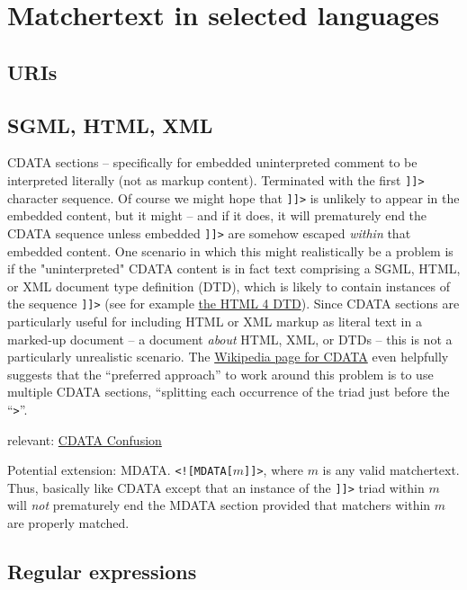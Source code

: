 \section{Matchertext in selected languages}
\label{sec:langs}


\subsection{URIs}

\subsection{SGML, HTML, XML}

CDATA sections -- specifically for embedded uninterpreted comment
to be interpreted literally (not as markup content).
Terminated with the first \verb|]]>| character sequence.
Of course we might hope that \verb|]]>| is unlikely to appear
in the embedded content, but it might --
and if it does, it will prematurely end the CDATA sequence
unless embedded \verb|]]>| are somehow escaped
\emph{within} that embedded content.
One scenario in which this might realistically be a problem
is if the "uninterpreted" CDATA content is in fact
text comprising a SGML, HTML, or XML document type definition (DTD),
which is likely to contain instances of the sequence \verb|]]>|
(see for example
\href{https://www.w3.org/TR/html4/sgml/dtd.html}{the HTML 4 DTD}).
Since CDATA sections are particularly useful
for including HTML or XML markup as literal text in a marked-up document --
\eg a document \emph{about} HTML, XML, or DTDs --
this is not a particularly unrealistic scenario.
The \href{https://en.wikipedia.org/wiki/CDATA}{Wikipedia page for CDATA}
even helpfully suggests that the ``preferred approach''
to work around this problem is to use multiple CDATA sections,
``splitting each occurrence of the triad
just before the ``\verb|>|''.

relevant:
\href{http://www.flightlab.com/~joe/sgml/cdata.html}{CDATA Confusion}


Potential extension: MDATA.
\verb|<![MDATA[|$m$\verb|]]>|,
where $m$ is any valid matchertext.
Thus, basically like CDATA except that
an instance of the \verb|]]>| triad within $m$
will \emph{not} prematurely end the MDATA section
provided that matchers within $m$ are properly matched.


\subsection{Regular expressions}

